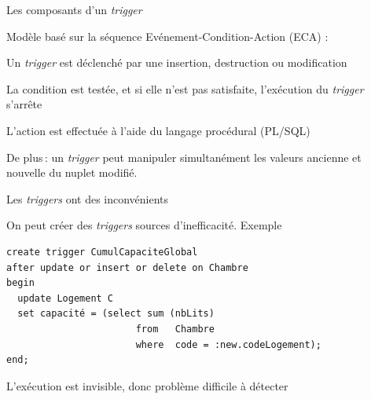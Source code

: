 \begin{frame}[fragile]{Les composants d'un \textit{trigger}}

Modèle basé sur la séquence Evénement-Condition-Action 
(ECA) :

\begin{redbullet}
  \item Un \textit{trigger} est déclenché par  une \alert{insertion, destruction ou modification} 
   \item La \alert{condition} est testée, et si elle n'est pas satisfaite, l'exécution du \textit{trigger} s'arrête
  \item L’\alert{action} est effectuée  à l’aide du langage procédural  (PL/SQL)
\end{redbullet}

\vfill

\begin{blocgauche}
\alert{De plus}\,: 
un \textit{trigger} peut manipuler 
simultanément les valeurs ancienne et nouvelle du nuplet modifié.
\end{blocgauche}
\end{frame}


\begin{frame}[fragile]{Les \textit{triggers} ont des inconvénients}

On peut créer des \textit{triggers} sources d'inefficacité.  Exemple

\small

\begin{small}
\begin{verbatim}
create trigger CumulCapaciteGlobal
after update or insert or delete on Chambre
begin
  update Logement C 
  set capacité = (select sum (nbLits) 
                       from   Chambre 
                       where  code = :new.codeLogement);
end;
\end{verbatim}
\end{small}
\vfill

L'exécution est invisible, donc problème difficile à détecter
\end{frame}



